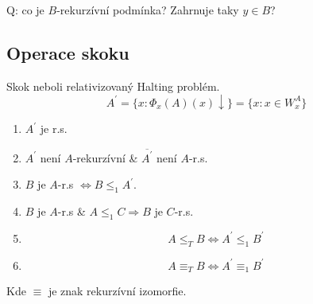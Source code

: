 Q: co je $B$-rekurzívní podmínka? Zahrnuje taky $y \in B$?

\subsection{Operace skoku}

\begin{definition}[Jump]\label{jump}
	Skok neboli relativizovaný Halting problém.
	\[ A^{\prime} = \{ x: \Phi_x(A)(x) \downarrow \} = \{ x: x \in W_x^A \} \]
\end{definition}

\begin{theorem}
	\begin{enumerate}
		\item $A^{\prime}$ je r.s.
		\item $A^{\prime}$ není $A$-rekurzívní \& $\overline{A^{\prime}}$ není $A$-r.s.
		\item $B$ je $A$-r.s $\iff B \leq_1 A^{\prime}$.
		\item $B$ je $A$-r.s \& $A \leq_1 C \Rightarrow B$ je $C$-r.s.
		\item \[ A \leq_T B \iff A^{\prime} \leq_1 B^{\prime} \]
		\item \[ A \equiv_T B \iff A^{\prime} \equiv_1 B^{\prime} \]
	\end{enumerate}

	Kde $\equiv$ je znak rekurzívní izomorfie.
\end{theorem}
